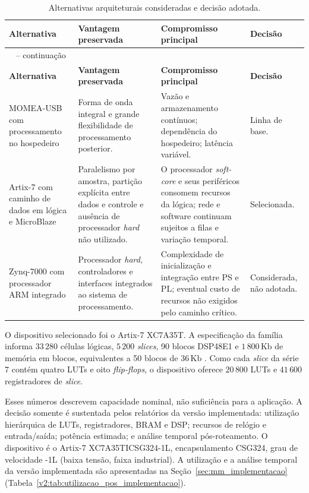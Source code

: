 \begingroup
\footnotesize
\renewcommand{\arraystretch}{1.25}
\begin{longtable}
	{|>{\raggedright\arraybackslash}p{}
		|>{\raggedright\arraybackslash}p{}
		|>{\raggedright\arraybackslash}p{}
		|>{\raggedright\arraybackslash}p{}|}
	\caption{Alternativas arquiteturais consideradas e decisão adotada.}
	\label{v2:tab:alternativas_arquitetura}\\
	\hline
	\textbf{Alternativa} & \textbf{Vantagem preservada} & \textbf{Compromisso principal} & \textbf{Decisão} \\
	\hline
	\endfirsthead
	\multicolumn{4}{c}
	{\tablename\ \thetable{} -- continuação}\\
	\hline
	\textbf{Alternativa} & \textbf{Vantagem preservada} & \textbf{Compromisso principal} & \textbf{Decisão} \\
	\hline
	\endhead
	\hline
	\endlastfoot
	MOMEA-USB com processamento no hospedeiro & Forma de onda integral e grande flexibilidade de processamento posterior. & Vazão e armazenamento contínuos; dependência do hospedeiro; latência variável. & Linha de base. \\
	\hline
	Artix-7 com caminho de dados em lógica e MicroBlaze & Paralelismo por amostra, partição explícita entre dados e controle e ausência de processador \textit{hard} não utilizado. & O processador \textit{soft-core} e seus periféricos consomem recursos da lógica; rede e software continuam sujeitos a filas e variação temporal. & Selecionada. \\
	\hline
	Zynq-7000 com processador ARM integrado & Processador \textit{hard}, controladores e interfaces integrados ao sistema de processamento. & Complexidade de inicialização e integração entre PS e PL; eventual custo de recursos não exigidos pelo caminho crítico. & Considerada, não adotada. \\
\end{longtable}
\endgroup

O dispositivo selecionado foi o Artix-7 XC7A35T. A especificação da família informa \(33\,280\) células lógicas, \(5\,200\) \textit{slices}, 90 blocos DSP48E1 e \(1\,800\,\mathrm{Kb}\) de memória em blocos, equivalentes a 50 blocos de \(36\,\mathrm{Kb}\) \cite{xilinx2020ds180}. Como cada \textit{slice} da série 7 contém quatro LUTs e oito \textit{flip-flops}, o dispositivo oferece \(20\,800\) LUTs e \(41\,600\) registradores de \textit{slice}.

Esses números descrevem capacidade nominal, não suficiência para a aplicação. A decisão somente é sustentada pelos relatórios da versão implementada: utilização hierárquica de LUTs, registradores, BRAM e DSP; recursos de relógio e entrada/saída; potência estimada; e análise temporal pós-roteamento. O dispositivo é o Artix-7 XC7A35TICSG324-1L, encapsulamento CSG324, grau de velocidade -1L (baixa tensão, faixa industrial). A utilização e a análise temporal da versão implementada são apresentadas na Seção~\ref{sec:mm_implementacao} (Tabela~\ref{v2:tab:utilizacao_pos_implementacao}). 

